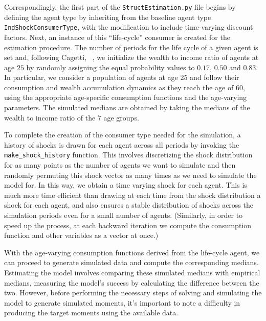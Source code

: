 Correspondingly, the first part of the \texttt{StructEstimation.py} file begins by defining the agent type by inheriting from the baseline agent type \texttt{IndShockConsumerType}, with the modification to include time-varying discount factors. Next, an instance of this ``life-cycle'' consumer is created for the estimation procedure.  The number of periods for the life cycle of a given agent is set and, following Cagetti, ~\citeyearpar{cagettiWprofiles}, we initialize the wealth to income ratio of agents at age $25$ by randomly assigning the equal probability values to $0.17$, $0.50$ and $0.83$. In particular, we consider a population of agents at age 25 and follow their consumption and wealth accumulation dynamics as they reach the age of $60$, using the appropriate age-specific consumption functions and the age-varying parameters. The simulated medians are obtained by taking the medians of the wealth to income ratio of the $7$ age groups.

To complete the creation of the consumer type needed for the simulation, a history of shocks is drawn for each agent across all periods by invoking the \texttt{make\_shock\_history} function. This involves discretizing the shock distribution for as many points as the number of agents we want to simulate and then randomly permuting this shock vector as many times as we need to simulate the model for. In this way, we obtain a time varying shock for each agent. This is much more time efficient than drawing at each time from the shock distribution a shock for each agent, and also ensures a stable distribution of shocks across the simulation periods even for a small number of agents. (Similarly, in order to speed up the process, at each backward iteration we compute the consumption function and other variables as a vector at once.)

With the age-varying consumption functions derived from the life-cycle agent, we can proceed to generate simulated data and compute the corresponding medians.  Estimating the model involves comparing these simulated medians with empirical medians, measuring the model's success by calculating the difference between the two.  However, before performing the necessary steps of solving and simulating the model to generate simulated moments, it's important to note a difficulty in producing the target moments using the available data.

